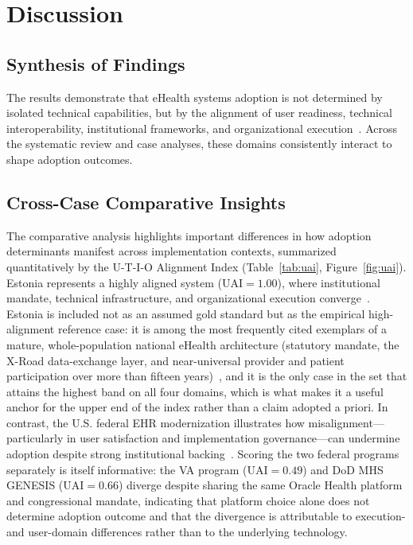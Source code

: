 \section{Discussion}

\subsection{Synthesis of Findings}
The results demonstrate that eHealth systems adoption is not determined by isolated technical capabilities, but by the alignment of user readiness, technical interoperability, institutional frameworks, and organizational execution~\cite{eden2016barriers,fennelly2020national,adams2020strategies}. Across the systematic review and case analyses, these domains consistently interact to shape adoption outcomes.

\subsection{Cross-Case Comparative Insights}
The comparative analysis highlights important differences in how adoption determinants manifest across implementation contexts, summarized quantitatively by the U-T-I-O Alignment Index (Table~\ref{tab:uai}, Figure~\ref{fig:uai}). Estonia represents a highly aligned system ($\mathrm{UAI}=1.00$), where institutional mandate, technical infrastructure, and organizational execution converge~\cite{estonia2026ehealth,europeancommission2016estoniaehr}. Estonia is included not as an assumed gold standard but as the empirical high-alignment reference case: it is among the most frequently cited exemplars of a mature, whole-population national eHealth architecture (statutory mandate, the X-Road data-exchange layer, and near-universal provider and patient participation over more than fifteen years)~\cite{estonia2026ehealth,europeancommission2016estoniaehr,parv2012estoniahie}, and it is the only case in the set that attains the highest band on all four domains, which is what makes it a useful anchor for the upper end of the index rather than a claim adopted a priori. In contrast, the U.S. federal EHR modernization illustrates how misalignment—particularly in user satisfaction and implementation governance—can undermine adoption despite strong institutional backing~\cite{gao2025vaehr,gao2024dodehr}. Scoring the two federal programs separately is itself informative: the VA program ($\mathrm{UAI}=0.49$) and DoD MHS GENESIS ($\mathrm{UAI}=0.66$) diverge despite sharing the same Oracle Health platform and congressional mandate, indicating that platform choice alone does not determine adoption outcome and that the divergence is attributable to execution- and user-domain differences rather than to the underlying technology.

